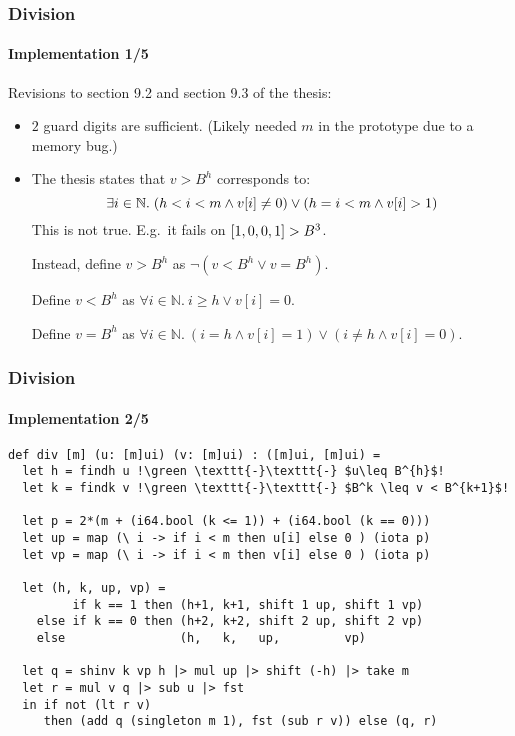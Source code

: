 \begin{frame}[fragile]
  \frametitle{Division}
  \framesubtitle{Implementation 1/5}
  Revisions to section 9.2 and section 9.3 of the thesis:
  \begin{itemize}
  \item $2$ guard digits are sufficient.\newline
    (Likely needed $m$ in the prototype due
    to a memory bug.)\pause
  \item The thesis states that $v > B^h$ corresponds to:
    \begin{equation}\footnotesize
    \exists i\in \mathbb{N}.~(h<i<m \land v[i] \neq 0) \lor (h = i<m \land v[i] > 1)
  \end{equation}
  This is not true. E.g.\ it fails on $\mathtt{[}1,0,0,1\mathtt{]} > B^3$.\pause

  Instead, define $v > B^h$ as {\footnotesize $\neg(v < B^h \lor v = B^h)$}.

  Define $v < B^h$ as {\footnotesize $\forall i\in \mathbb{N}.~i \geq h \lor v[i] = 0$}.

  Define $v = B^h$ as {\footnotesize $\forall i\in \mathbb{N}.~(i=h \land v[i] = 1) \lor (i \neq h \land v[i] = 0)$}.
    \end{itemize}
  \end{frame}

\begin{frame}[fragile]
  \frametitle{Division}
  \framesubtitle{Implementation 2/5}
\begin{lstlisting}[language=futhark,basicstyle=\scriptsize,escapeinside=!!,frame=single]
def div [m] (u: [m]ui) (v: [m]ui) : ([m]ui, [m]ui) =
  let h = findh u !\green \texttt{-}\texttt{-} $u\leq B^{h}$!
  let k = findk v !\green \texttt{-}\texttt{-} $B^k \leq v < B^{k+1}$!

  let p = 2*(m + (i64.bool (k <= 1)) + (i64.bool (k == 0)))
  let up = map (\ i -> if i < m then u[i] else 0 ) (iota p)
  let vp = map (\ i -> if i < m then v[i] else 0 ) (iota p)

  let (h, k, up, vp) =
         if k == 1 then (h+1, k+1, shift 1 up, shift 1 vp)
    else if k == 0 then (h+2, k+2, shift 2 up, shift 2 vp)
    else                (h,   k,   up,         vp)

  let q = shinv k vp h |> mul up |> shift (-h) |> take m
  let r = mul v q |> sub u |> fst
  in if not (lt r v)
     then (add q (singleton m 1), fst (sub r v)) else (q, r)
\end{lstlisting}
\end{frame}

